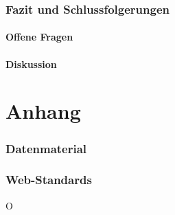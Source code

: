 \documentclass[paper=a4,fontsize=12pt,ngerman]{scrartcl}
\begin{document}
\section{Fazit und Schlussfolgerungen}


\subsection{Offene Fragen}


\subsection{Diskussion}


\clearpage
\renewcommand\refname{Literaturverzeichnis}




\clearpage
\appendix
\part*{Anhang}

\section{Datenmaterial}


\section{Web-Standards}
O
\end{document}
